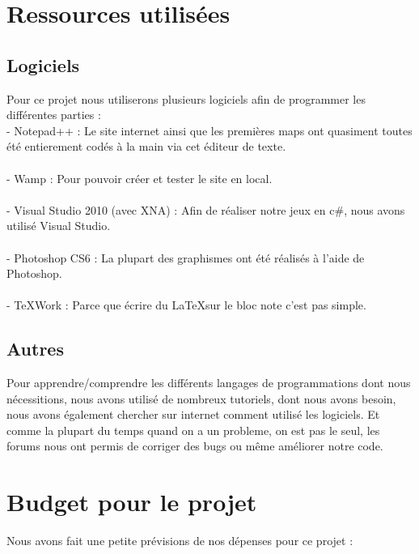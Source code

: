 \documentclass [11pt]{report}
\begin{document}
\chapter {Ressources utilisées}
	\section {Logiciels}

	Pour ce projet nous utiliserons plusieurs logiciels afin de programmer les différentes parties :\\

	- Notepad++ : Le site internet ainsi que les premières maps ont quasiment toutes été entierement codés à la main via cet éditeur de texte.\\\\\indent
	- Wamp : Pour pouvoir créer et tester le site en local.\\\\\indent
	- Visual Studio 2010 (avec XNA) : Afin de réaliser notre jeux en c\#, nous avons utilisé Visual Studio.\\\\\indent
	- Photoshop CS6 : La plupart des graphismes ont été réalisés à l'aide de Photoshop.\\\\\indent
	- TeXWork : Parce que écrire du \LaTeX sur le bloc note c'est pas simple.\\\vspace{8mm}



	\section {Autres}

	Pour apprendre/comprendre les différents langages de programmations dont nous nécessitions, nous avons utilisé de nombreux tutoriels, dont nous avons besoin, nous avons également chercher sur internet comment utilisé les logiciels. Et comme la plupart du temps quand on a un probleme, on est pas le seul, les forums nous ont permis de corriger des bugs ou même améliorer notre code.


\chapter {Budget pour le projet}
	Nous avons fait une petite prévisions de nos dépenses pour ce projet :\\\\
\end{document}
